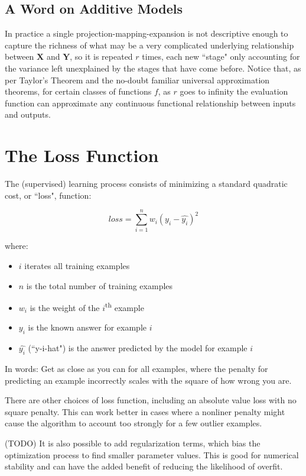 \documentclass[12pt]{article}
\begin{document}
\subsection{A Word on Additive Models}

In practice a single projection-mapping-expansion is not descriptive enough to capture the richness of what may be a very complicated underlying relationship between $\pmb{X}$ and $\pmb{Y}$, so it is repeated $r$ times, each new ``stage" only accounting for the variance left unexplained by the stages that have come before. Notice that, as per Taylor's Theorem and the no-doubt familiar universal approximation theorems, for certain classes of functions $f$, as $r$ goes to infinity the evaluation function can approximate any continuous functional relationship between inputs and outputs.

\section{The Loss Function}

The (supervised) learning process consists of minimizing a standard quadratic cost, or ``loss", function:

$$loss = \sum_{i=1}^n w_i (y_i - \hat{y_i})^2$$

where:
\begin{itemize}
	\setlength\itemsep{-2mm}
	\item $i$ iterates all training examples
	\item $n$ is the total number of training examples
	\item $w_i$ is the weight of the $i$\textsuperscript{th} example
	\item $y_i$ is the known answer for example $i$
	\item $\hat{y_i}$ (``y-i-hat") is the answer predicted by the model for example $i$
\end{itemize}

In words: Get as close as you can for all examples, where the penalty for predicting an example incorrectly scales with the square of how wrong you are.

There are other choices of loss function, including an absolute value loss with no square penalty. This can work better in cases where a nonliner penalty might cause the algorithm to account too strongly for a few outlier examples.

(TODO) It is also possible to add regularization terms, which bias the optimization process to find smaller parameter values. This is good for numerical stability and can have the added benefit of reducing the likelihood of overfit.
\end{document}
